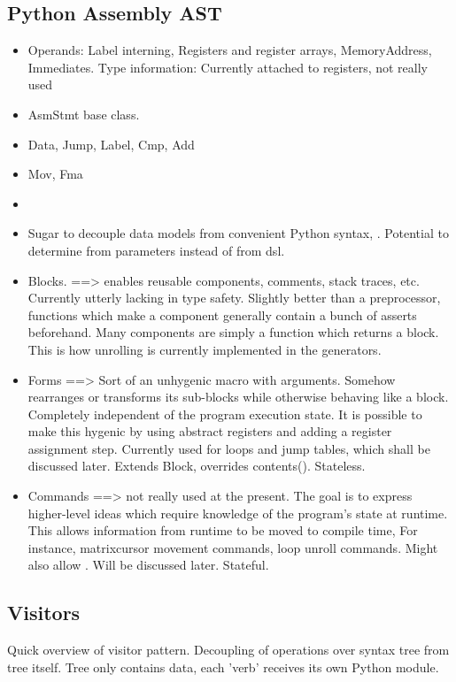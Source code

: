 \subsection{Python Assembly AST}
\begin{itemize}
  \item Operands: Label interning, Registers and register arrays, MemoryAddress, Immediates. Type information: Currently attached to registers, not really used

  \item AsmStmt base class. 
  \item Data, Jump, Label, Cmp, Add
  \item Mov, Fma
  \item

  \item Sugar to decouple data models from convenient Python syntax,
    . Potential to determine from parameters instead of from dsl. 

  \item Blocks. ==> enables reusable components, comments, stack traces, etc. Currently utterly lacking in type safety. Slightly better than a preprocessor, functions which make a component generally contain a bunch of asserts beforehand. Many components are simply a function which returns a block. This is how unrolling is currently implemented in the generators.

  \item Forms ==> Sort of an unhygenic macro with arguments. Somehow rearranges or transforms its sub-blocks while otherwise behaving like a block. Completely independent of the program execution state. It is possible to make this hygenic by using abstract registers and adding a register assignment step. Currently used for loops and jump tables, which shall be discussed later. Extends Block, overrides contents(). Stateless.

  \item Commands ==> not really used at the present. The goal is to express higher-level ideas which require knowledge of the program's state at runtime. This allows information from runtime to be moved to compile time, For instance, matrixcursor movement commands, loop unroll commands. Might also allow . Will be discussed later. Stateful.

\end{itemize}

\subsection{Visitors}
Quick overview of visitor pattern. Decoupling of operations over syntax tree from tree itself. Tree only contains data, each 'verb' receives its own Python module.

